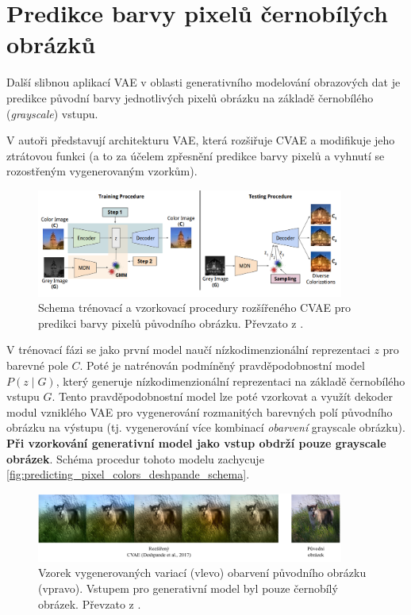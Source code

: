 \newpage
\section{Predikce barvy pixelů černobílých obrázků}
\label{sec:applications_image_coloring}
Další slibnou aplikací VAE v oblasti generativního modelování obrazových dat je predikce původní barvy jednotlivých pixelů obrázku na základě černobílého (\emph{grayscale}) vstupu.

V \cite{Deshpande2017} autoři představují architekturu VAE, která rozšiřuje CVAE a modifikuje jeho ztrátovou funkci (a to za účelem zpřesnění predikce barvy pixelů a vyhnutí se rozostřeným vygenerovaným vzorkům).
\begin{figure}[H]
    \centering
    \includegraphics[width=0.9\textwidth]{figures/applications/predicting_pixel_colors_deshpande_vae_schema.png}
    \caption{Schema trénovací a vzorkovací procedury rozšířeného CVAE pro predikci barvy pixelů původního obrázku. Převzato z \cite{Deshpande2017}.}
    \label{fig:predicting_pixel_colors_deshpande_schema}
\end{figure}

V trénovací fázi se jako první model naučí nízkodimenzionální reprezentaci $z$ pro barevné pole $C$.
Poté je natrénován podmíněný pravděpodobnostní model $P(z \mid G)$, který generuje nízkodimenzionální reprezentaci na základě černobílého vstupu $G$. 
Tento pravděpodobnostní model lze poté vzorkovat a využít dekoder modul vzniklého VAE pro vygenerování rozmanitých barevných polí původního obrázku na výstupu (tj. vygenerování více kombinací \emph{obarvení} grayscale obrázku).
\textbf{Při vzorkování generativní model jako vstup obdrží pouze grayscale obrázek}. Schéma procedur tohoto modelu zachycuje \autoref{fig:predicting_pixel_colors_deshpande_schema}. \cite{Deshpande2017}

\begin{figure}[H]
    \centering
    \includegraphics[width=0.9\textwidth]{figures/applications/predicting_pixel_colors_deshpande.pdf}
    \caption{Vzorek vygenerovaných variací (vlevo) obarvení původního obrázku (vpravo). Vstupem pro generativní model byl pouze černobílý obrázek. Převzato z \cite{Deshpande2017}.}
    \label{fig:predicting_pixel_colors_deshpande}
\end{figure}

